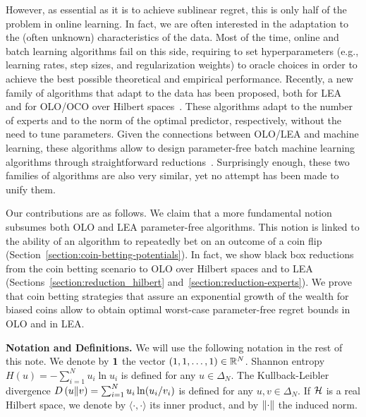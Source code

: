 However, as essential as it is to achieve sublinear regret, this is only half
of the problem in online learning. In fact, we are often interested in the
adaptation to the (often unknown) characteristics of the data. Most of the
time, online and batch learning algorithms fail on this side, requiring to set
hyperparameters (e.g., learning rates, step sizes, and regularization weights)
to oracle choices in order to achieve the best possible theoretical and
empirical performance. Recently, a new family of algorithms that adapt to the
data has been proposed, both for \ac{LEA}~\citep{Chaudhuri-Freund-Hsu-2009,
Chernov-Vovk-2010, Luo-Schapire-2014, Luo-Schapire-2015, Koolen-van-Erven-2015}
and for \ac{OLO}/\ac{OCO} over Hilbert spaces~\citep{Streeter-McMahan-2012,
Orabona-2013, McMahan-Abernethy-2013, McMahan-Orabona-2014, Orabona-2014}.
These algorithms adapt to the number of experts and to the norm of the optimal
predictor, respectively, without the need to tune parameters. Given the
connections between \ac{OLO}/\ac{LEA} and machine learning, these algorithms
allow to design parameter-free batch machine learning algorithms through
straightforward reductions~\citep{Orabona-2014,Luo-Schapire-2015}.
Surprisingly enough, these two families of algorithms are also very similar,
yet no attempt has been made to unify them.

Our contributions are as follows. We claim that a more fundamental notion
subsumes both \ac{OLO} and \ac{LEA} parameter-free algorithms. This notion is
linked to the ability of an algorithm to repeatedly bet on an outcome of a coin
flip (Section~\ref{section:coin-betting-potentials}). In fact, we show black
box reductions from the coin betting scenario to \ac{OLO} over Hilbert spaces
and to \ac{LEA} (Sections~\ref{section:reduction_hilbert}
and~\ref{section:reduction-experts}).  We prove that coin betting strategies
that assure an exponential growth of the wealth for biased coins allow to
obtain optimal worst-case parameter-free regret bounds in \ac{OLO} and in
\ac{LEA}.

\noindent\textbf{Notation and Definitions.} We will use the following notation
in the rest of this note. We denote by $\mathbf{1}$ the vector $(1,1,\dots,1)
\in \mathbb{R}^N$. Shannon entropy $H(u) = -\sum_{i=1}^N u_i \ln u_i$ is defined for
any $u \in \Delta_N$.  The Kullback-Leibler divergence $D\left({u}\middle\|{v}\right) =
\sum_{i=1}^N u_i \ln(u_i/v_i)$ is defined for any $u,v \in \Delta_N$. If $\mathcal{H}$
is a real Hilbert space, we denote by $\langle \cdot, \cdot \rangle$ its inner
product, and by $\left\|{\cdot}\right\|$ the induced norm.
